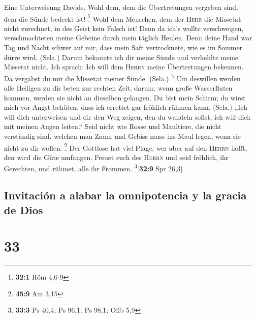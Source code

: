  Eine Unterweisung Davids. Wohl dem, dem die Übertretungen
vergeben sind, dem die Sünde bedeckt ist! \footnote{\textbf{32:1} Röm
  4,6-9}  Wohl dem Menschen, dem der \textsc{Herr} die
Missetat nicht zurechnet, in des Geist kein Falsch ist! 
Denn da ich's wollte verschweigen, verschmachteten meine Gebeine durch
mein täglich Heulen.  Denn deine Hand war Tag und Nacht
schwer auf mir, dass mein Saft vertrocknete, wie es im Sommer dürre
wird. (Sela.)  Darum bekannte ich dir meine Sünde und
verhehlte meine Missetat nicht. Ich sprach: Ich will dem \textsc{Herrn}
meine Übertretungen bekennen. Da vergabst du mir die Missetat meiner
Sünde. (Sela.) \textsuperscript{b}  Um deswillen werden
alle Heiligen zu dir beten zur rechten Zeit; darum, wenn große
Wasserfluten kommen, werden sie nicht an dieselben gelangen.
 Du bist mein Schirm; du wirst mich vor Angst behüten,
dass ich errettet gar fröhlich rühmen kann. (Sela.)  „Ich
will dich unterweisen und dir den Weg zeigen, den du wandeln sollst; ich
will dich mit meinen Augen leiten.``  Seid nicht wie Rosse
und Maultiere, die nicht verständig sind, welchen man Zaum und Gebiss
muss ins Maul legen, wenn sie nicht zu dir wollen. \footnote{\textbf{45:9}
  Am 3,15}  Der Gottlose hat viel Plage; wer aber auf den
\textsc{Herrn} hofft, den wird die Güte umfangen.  Freuet
euch des \textsc{Herrn} und seid fröhlich, ihr Gerechten, und rühmet,
alle ihr Frommen. \footnote{\textbf{33:3} Ps 40,4; Ps 96,1; Ps 98,1;
  Offb 5,9}{[}\textbf{32:9} Spr 26,3{]}

\hypertarget{invitaciuxf3n-a-alabar-la-omnipotencia-y-la-gracia-de-dios}{%
\subsection{Invitación a alabar la omnipotencia y la gracia de
Dios}\label{invitaciuxf3n-a-alabar-la-omnipotencia-y-la-gracia-de-dios}}

\hypertarget{section-32}{%
\section{33}\label{section-32}}

